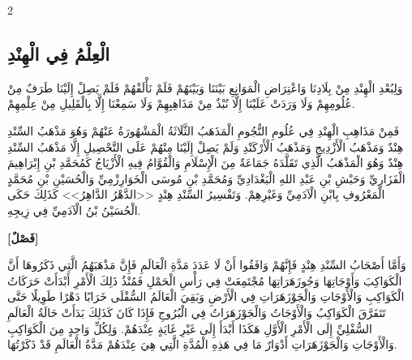 \documentclass[11pt,a4paper]{article}
\newcommand{\ar}[1]{{\arabicfont\beginR #1\endR}}
\begin{document}
\begin{paracol}{2}
\sloppy

\begin{leftcolumn}
\subsection*{\ar{الْعِلْمُ فِي الْهِنْدِ}}
\vspace{0.3cm}
{\arabicfont\beginR
وَلِبُعْدِ الْهِنْدِ مِنْ بِلَادِنَا وَاعْتِرَاضِ الْمَوَانِعِ بَيْنَنَا وَبَيْنَهُمْ فَلَمْ نَأْلَفْهُمْ فَلَمْ يَصِلْ إِلَيْنَا طَرَفٌ مِنْ عُلُومِهِمْ وَلَا وَرَدَتْ عَلَيْنَا إِلَّا نُبْذٌ مِنْ مَذَاهِبِهِمْ وَلَا سَمِعْنَا إِلَّا بِالْقَلِيلِ مِنْ عِلْمِهِمْ.
\endR}

\vspace{0.3cm}
{\arabicfont\beginR
فَمِنْ مَذَاهِبِ الْهِنْدِ فِي عُلُومِ النُّجُومِ الْمَذَهَبُ الثَّلَاثَةُ الْمَشْهُورَةُ عَنْهُمْ وَهُوَ مَذْهَبُ السِّنْدِ هِنْدٌ وَمَذْهَبُ الْأَزْدِيجِ وَمَذْهَبُ الْأَرْكَنْدِ وَلَمْ يَصِلْ إِلَيْنَا مِنْهُمْ عَلَى التَّحْصِيلِ إِلَّا مَذْهَبُ السِّنْدِ هِنْدٌ وَهُوَ الْمَذْهَبُ الَّذِي تَقَلَّدَهُ جَمَاعَةٌ مِنَ الْإِسْلَامِ وَالْقُوَّامُ فِيهِ الْأَزْيَاجُ كَمُحَمَّدِ بْنِ إِبْرَاهِيمَ الْفَزَارِيِّ وَحَبْشِ بْنِ عَبْدِ اللهِ الْبَغْدَادِيِّ وَمُحَمَّدِ بْنِ مُوسَى الْخَوَارِزْمِيِّ وَالْحُسَيْنِ بْنِ مُحَمَّدٍ الْمَعْرُوفِ بِابْنِ الْآدَمِيِّ وَغَيْرِهِمْ. وَتَفْسِيرُ السِّنْدِ هِنْدٍ <<الدَّهْرُ الدَّاهِرُ>> كَذَلِكَ حَكَى الْحُسَيْنُ بْنُ الْآدَمِيِّ فِي زِيجِهِ.
\endR}

\vspace{0.4cm}
{\arabicfont\beginR
\textbf{[فَصْلٌ]}
\endR}

\vspace{0.3cm}
{\arabicfont\beginR
وَأَمَّا أَصْحَابُ السِّنْدِ هِنْدٍ فَإِنَّهُمْ وَافَقُوا أَنْ لَا عَدَدَ مَدَّةِ الْعَالَمِ فَإِنَّ مَذْهَبَهُمُ الَّتِي ذَكَرُوهَا أَنَّ الْكَوَاكِبَ وَأَوْجَاتِهَا وَجُوزَهَرَاتِهَا مُجْتَمِعَتْ فِي رَأْسِ الْحَمْلِ فَمُنْذُ ذَلِكَ الْأَمْرِ أَبْدَأَتْ حَرَكَاتُ الْكَوَاكِبِ وَالْأَوْجَاتِ وَالْجَوْزَهَرَاتِ فِي الْأَرْضِ وَبَقِيَ الْعَالَمُ السُّفْلَى خَرَابًا دَهْرًا طَوِيلًا حَتَّى تَتَفَرَّقَ الْكَوَاكِبُ وَالْأَوْجَاتُ وَالْجَوْزَهَرَاتُ فِي الْبُرُوجِ فَإِذَا كَانَ كَذَلِكَ بَدَأَتْ حَالَةُ الْعَالَمِ السُّفْلِيِّ إِلَى الْأَمْرِ الْأَوَّلِ هَكَذَا أَبْدَأَ إِلَى غَيْرِ غَايَةٍ عِنْدَهُمْ. وَلِكُلِّ وَاحِدٍ مِنَ الْكَوَاكِبِ وَالْأَوْجَاتِ وَالْجَوْزَهَرَاتِ أَدْوَارٌ مَا فِي هَذِهِ الْمُدَّةِ الَّتِي هِيَ عِنْدَهُمْ مَدَّةُ الْعَالَمِ قَدْ ذَكَرْتُهَا.
\endR}
\end{leftcolumn}


\end{paracol}
\end{document}
